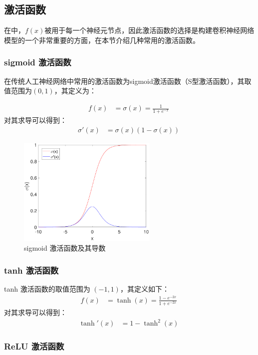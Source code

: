 \subsection{激活函数}

在中，$f(x)$被用于每一个神经元节点，因此激活函数的选择是构建卷积神经网络模型的一个非常重要的方面，在本节介绍几种常用的激活函数。

\subsubsection{sigmoid 激活函数}

在传统人工神经网络中常用的激活函数为sigmoid激活函数（S型激活函数），其取值范围为$(0,1)$，其定义为：

\begin{align}
f(x)&=\sigma(x)=\frac{1}{1+e^{-x}}\;
\end{align}
对其求导可以得到：
\begin{align}
\sigma'(x)&=\sigma(x)\left(1-\sigma(x)\right)\;
\end{align}

\begin{figure}[hbt]
	\centering
	\includegraphics[width=6.67cm]{figures/networks/sigmoid}
	\caption{sigmoid 激活函数及其导数}
	\label{fig:sigmoid}
\end{figure}

\subsubsection{ tanh 激活函数}

tanh 激活函数的取值范围为 $(-1,1)$，其定义如下：
\begin{align}
f(x)&=\tanh(x)=\frac{1-e^{-2x}}{1+e^{-2x}}\;
\end{align}
对其求导可以得到：
\begin{align}
\tanh'(x)&=1-\tanh^2(x)\;
\end{align}


\subsubsection{ReLU 激活函数}

